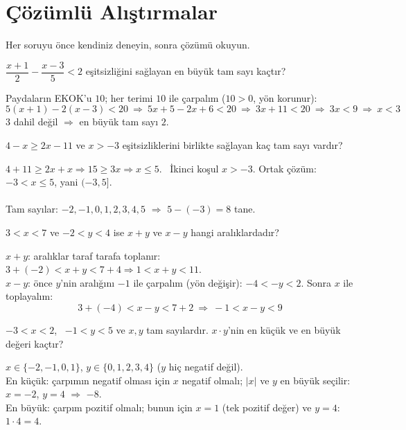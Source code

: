 \section{Çözümlü Alıştırmalar}
Her soruyu önce kendiniz deneyin, sonra çözümü okuyun.

\begin{alistirma}
\(\dfrac{x+1}{2}-\dfrac{x-3}{5}<2\) eşitsizliğini sağlayan en büyük tam sayı kaçtır?
\end{alistirma}
\begin{cozum}
Paydaların EKOK'u \(10\); her terimi \(10\) ile çarpalım (\(10>0\), yön korunur):
\[5(x+1)-2(x-3)<20\ \Rightarrow\ 5x+5-2x+6<20\ \Rightarrow\ 3x+11<20\ \Rightarrow\ 3x<9\ \Rightarrow\ x<3\]
\(3\) dahil değil \(\Rightarrow\) en büyük tam sayı \(2\).
\end{cozum}

\begin{alistirma}
\(4-x\ge 2x-11\) ve \(x>-3\) eşitsizliklerini birlikte sağlayan kaç tam sayı vardır?
\end{alistirma}
\begin{cozum}
\(4+11\ge 2x+x\Rightarrow 15\ge 3x\Rightarrow x\le 5\). \ İkinci koşul \(x>-3\). Ortak çözüm: \(-3<x\le 5\), yani \((-3,5]\).\\
\\
Tam sayılar: \(-2,-1,0,1,2,3,4,5\) \(\Rightarrow\) \(5-(-3)=8\) tane.
\end{cozum}

\begin{alistirma}
\(3<x<7\) ve \(-2<y<4\) ise \(x+y\) ve \(x-y\) hangi aralıklardadır?
\end{alistirma}
\begin{cozum}
\(x+y\): aralıklar taraf tarafa toplanır: \(3+(-2)<x+y<7+4\Rightarrow 1<x+y<11\).\\
\(x-y\): önce \(y\)'nin aralığını \(-1\) ile çarpalım (yön değişir): \(-4<-y<2\). Sonra \(x\) ile toplayalım:
\[3+(-4)<x-y<7+2\ \Rightarrow\ -1<x-y<9\]
\end{cozum}

\begin{alistirma}
\(-3<x<2\), \ \(-1<y<5\) ve \(x,y\) tam sayılardır. \(x\cdot y\)'nin en küçük ve en büyük değeri kaçtır?
\end{alistirma}
\begin{cozum}
\(x\in\{-2,-1,0,1\}\), \quad \(y\in\{0,1,2,3,4\}\) (\(y\) hiç negatif değil).\\
En küçük: çarpımın negatif olması için \(x\) negatif olmalı; \(|x|\) ve \(y\) en büyük seçilir: \(x=-2\), \(y=4\) \(\Rightarrow\) \(-8\).\\
En büyük: çarpım pozitif olmalı; bunun için \(x=1\) (tek pozitif değer) ve \(y=4\): \(1\cdot 4=4\).
\end{cozum}

